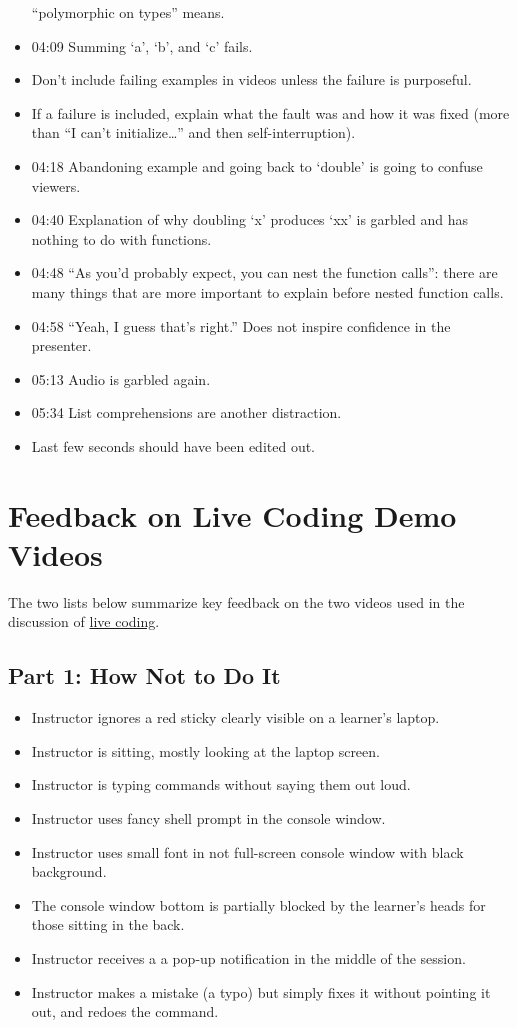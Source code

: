 \documentclass[10pt,statementpaper]{memoir}
\begin{document}
\begin{itemize}
  ``polymorphic on types'' means.
\item
  04:09 Summing `a', `b', and `c' fails.
\item
  Don't include failing examples in videos unless the failure is
  purposeful.
\item
  If a failure is included, explain what the fault was and how it was
  fixed (more than ``I can't initialize\ldots{}'' and then
  self-interruption).
\item
  04:18 Abandoning example and going back to `double' is going to
  confuse viewers.
\item
  04:40 Explanation of why doubling `x' produces `xx' is garbled and has
  nothing to do with functions.
\item
  04:48 ``As you'd probably expect, you can nest the function calls'':
  there are many things that are more important to explain before nested
  function calls.
\item
  04:58 ``Yeah, I guess that's right.'' Does not inspire confidence in
  the presenter.
\item
  05:13 Audio is garbled again.
\item
  05:34 List comprehensions are another distraction.
\item
  Last few seconds should have been edited out.
\end{itemize}

\section{Feedback on Live Coding Demo
Videos}\label{feedback-on-live-coding-demo-videos}

The two lists below summarize key feedback on the two videos used in the
discussion of \href{live.html}{live coding}.

\subsection*{Part 1: How Not to Do It}\label{part-1-how-not-to-do-it}

\begin{itemize}
\item
  Instructor ignores a red sticky clearly visible on a learner's laptop.
\item
  Instructor is sitting, mostly looking at the laptop screen.
\item
  Instructor is typing commands without saying them out loud.
\item
  Instructor uses fancy shell prompt in the console window.
\item
  Instructor uses small font in not full-screen console window with
  black background.
\item
  The console window bottom is partially blocked by the learner's heads
  for those sitting in the back.
\item
  Instructor receives a a pop-up notification in the middle of the
  session.
\item
  Instructor makes a mistake (a typo) but simply fixes it without
  pointing it out, and redoes the command.
\end{itemize}
\end{document}
